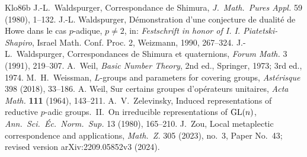 \begin{thebibliography}{Klo86b}
 J.-L.~Waldspurger, Correspondance de Shimura, \emph{J.\ Math.\ Pures Appl.} 59 (1980), 1--132.
 J.-L. Waldspurger, D\'emonstration d'une conjecture de dualit\'e de Howe dans le cas $p$-adique, $p\ne2$, in: \emph{Festschrift in honor of I. I. Piatetski-Shapiro}, Israel Math. Conf. Proc. 2, Weizmann, 1990, 267--324.
 J.-L.~Waldspurger, Correspondances de Shimura et quaternions, \emph{Forum Math.} 3 (1991), 219--307.
 A.~Weil, \emph{Basic Number Theory}, 2nd ed., Springer, 1973; 3rd ed., 1974.
 M.~H.~Weissman, $L$-groups and parameters for covering groups, \emph{Ast\'erisque} 398 (2018), 33--186.
 A. Weil, Sur certains groupes d'op\'erateurs unitaires, \emph{Acta Math.} \textbf{111} (1964), 143--211.
 A.~V.~Zelevinsky, Induced representations of reductive $p$-adic groups.\ II.\ On irreducible representations of $\mathrm{GL}(n)$, \emph{Ann.\ Sci.\ \'Ec.\ Norm.\ Sup.} 13 (1980), 165--210.
 J.~Zou, Local metaplectic correspondence and applications, \emph{Math.\ Z.} 305 (2023), no.~3, Paper No.~43; revised version arXiv:2209.05852v3 (2024).
\end{thebibliography}
